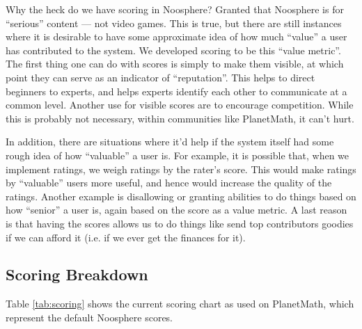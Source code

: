 
Why the heck do we have scoring in Noosphere? Granted that Noosphere is for ``serious'' content --- not video games. This is true, but there are still instances where it is desirable to have some approximate idea of how much
``value'' a user has contributed to the system. We developed scoring to be this ``value metric''. The first thing one can do with scores is simply to make them visible, at which point they can serve as an indicator of ``reputation''. This helps to direct beginners to experts, and helps experts identify each other to communicate at a common level. Another use for visible scores are to encourage competition. While this is probably not necessary, within communities like PlanetMath, it can't hurt.

In addition, there are situations where it'd help if the system itself had some rough idea of how ``valuable'' a user is. For example, it is possible that, when we implement ratings, we weigh ratings by the rater's score. This would make ratings by ``valuable'' users more useful, and hence would increase the quality of the ratings. Another example is disallowing or granting abilities to do things based on how ``senior'' a user is, again based on the score as a value metric. A last reason is that having the scores allows us to do things like send top contributors goodies if we can afford it (i.e. if we ever get the finances for it).

\subsection*{Scoring Breakdown}

Table \ref{tab:scoring} shows the current scoring chart as used on PlanetMath, which represent the default Noosphere scores.

